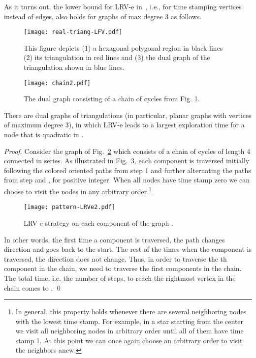 As it turns out, the lower bound for LRV-e in~\cite{cik+-drwug-11}, i.e., for time stamping vertices instead of edges,
also holds for graphs of max degree 3 as follows.
\begin{figure}[h]\centering
 \texttt{[image: real-triang-LFV.pdf]}
\caption{This figure depicts (1) a hexagonal polygonal region in black lines (2) its triangulation  in red lines
and (3) the dual graph of the triangulation  shown in blue lines.} \label{triang}
 \end{figure}

\begin{figure}[h]\centering
\texttt{[image: chain2.pdf]}
\caption{The dual graph  consisting of a chain of  cycles from Fig. \ref{triang}.} \label{GD-LRVe}
 \end{figure}

\begin{theorem}
\label{th:lb.LRV-e}
There are dual graphs of triangulations (in particular, planar graphs with  vertices of maximum degree 3),
in which LRV-e leads to a largest exploration time for a node
that is quadratic in .
\end{theorem}

\begin{proof}
Consider the graph  of Fig.~\ref{GD-LRVe} which consists of a chain of  cycles of length 4 connected in series.
As illustrated in Fig.~\ref{pattern-LRVe}, each component is traversed
initially following the colored oriented paths from step 1 and further
alternating the paths from step  and , for  positive integer.
When all nodes have time stamp zero we can choose to visit the nodes in any arbitrary
order.\footnote{In general, this property holds whenever there are several neighboring nodes
with the lowest time stamp. For example, in a star starting from the center we visit all neighboring
nodes in arbitrary order until all
of them have time stamp 1. At this point we can once again choose an arbitrary order to visit the
neighbors anew.}

 \begin{figure}\centering
 \texttt{[image: pattern-LRVe2.pdf]}
\caption{LRV-e strategy on each component of the graph .} \label{pattern-LRVe}
 \end{figure}
In other words, the first time a component is traversed, the path
changes direction and goes back to the start. The rest of the times
when the component is traversed, the direction does not change.
Thus, in order to traverse the th component in the chain, we need
to traverse the first  components in the chain.
The total time, i.e. the number of steps, to reach the rightmost vertex in the chain comes to
.
\qed
\end{proof}

